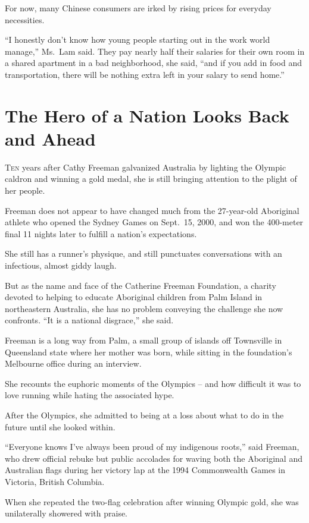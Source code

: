 ﻿\documentclass[12pt]{article}
\begin{document}
For now, many Chinese consumers are irked by rising prices for everyday necessities.

``I honestly don't know how young people starting out in the work world manage,'' Ms.~Lam said. They
pay nearly half their salaries for their own room in a shared apartment in a bad neighborhood, she
said, ``and if you add in food and transportation, there will be nothing extra left in your salary
to send home.''

\pagebreak
\section{The Hero of a Nation Looks Back and Ahead}

\lettrine{T}{en} years after Cathy Freeman galvanized Australia by lighting
the Olympic caldron and winning a gold medal, she is still bringing attention to the plight of her
people.

Freeman does not appear to have changed much from the 27-year-old Aboriginal athlete who opened the
Sydney Games on Sept.~15, 2000, and won the 400-meter final 11 nights later to fulfill a nation's
expectations.

She still has a runner's physique, and still punctuates conversations with an infectious, almost
giddy laugh.

But as the name and face of the Catherine Freeman Foundation, a charity devoted to helping to
educate Aboriginal children from Palm Island in northeastern Australia, she has no problem conveying
the challenge she now confronts. ``It is a national disgrace,'' she said.

Freeman is a long way from Palm, a small group of islands off Townsville in Queensland state where
her mother was born, while sitting in the foundation's Melbourne office during an interview.

She recounts the euphoric moments of the Olympics -- and how difficult it was to love running while
hating the associated hype.

After the Olympics, she admitted to being at a loss about what to do in the future until she looked
within.

``Everyone knows I've always been proud of my indigenous roots,'' said Freeman, who drew official
rebuke but public accolades for waving both the Aboriginal and Australian flags during her victory
lap at the 1994 Commonwealth Games in Victoria, British Columbia.

When she repeated the two-flag celebration after winning Olympic gold, she was unilaterally showered
with praise.
\end{document}
